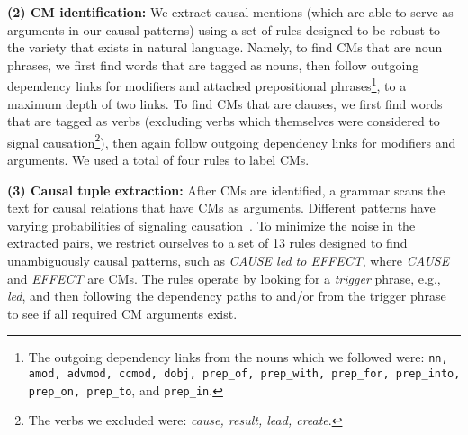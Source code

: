 {\flushleft \textbf{(2) CM identification:}} \label{step:cm} We extract causal mentions (which are able to serve as arguments in our causal patterns) using a set of rules %
designed to be robust to the variety that exists in natural language. %
Namely, to find CMs that are noun phrases, we first find words that are tagged as nouns, then follow outgoing dependency links for modifiers and attached prepositional phrases\footnote{The outgoing dependency links from the nouns which we followed were: \texttt{nn, amod, advmod, ccmod, dobj, prep\_of, prep\_with, prep\_for, prep\_into, prep\_on, prep\_to}, and \texttt{prep\_in}.}, to a maximum depth of two links.  To find CMs that are clauses, we first find words that are tagged as verbs (excluding verbs which themselves were considered to signal causation\footnote{The verbs we excluded were: \emph{cause, result, lead, create}.}), then again follow outgoing dependency links for modifiers and arguments.  We used a total of four rules to label CMs.%

{\flushleft \textbf{(3) Causal tuple extraction:}} \label{step:causalext} After CMs are identified, a grammar scans the text for causal relations that have CMs as arguments.  Different patterns have varying probabilities of signaling causation~\cite{khoo1998automatic}.  To minimize the noise in the extracted pairs, we restrict ourselves to a set of 13 rules designed to find unambiguously causal patterns, such as {\em CAUSE led to EFFECT}, where {\em CAUSE} and {\em EFFECT} are CMs.
The rules operate by looking for a \emph{trigger} phrase, e.g., {\em led}, and then following the dependency paths to and/or from the trigger phrase to see if all required CM arguments exist.

